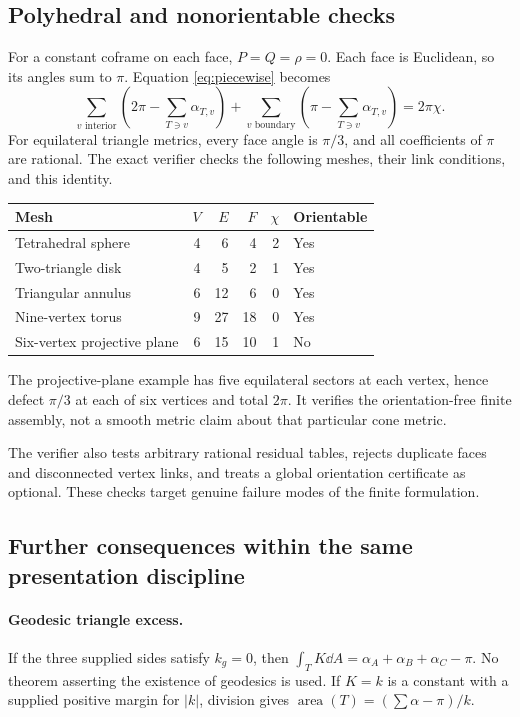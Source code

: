 \subsection{Polyhedral and nonorientable checks}

For a constant coframe on each face, $P=Q=\rho=0$. Each face is Euclidean, so its angles sum to $\pi$. Equation \eqref{eq:piecewise} becomes
\[
\sum_{v\text{ interior}}\left(2\pi-\sum_{T\ni v}\alpha_{T,v}\right)
+\sum_{v\text{ boundary}}\left(\pi-\sum_{T\ni v}\alpha_{T,v}\right)
=2\pi\chi.
\]
For equilateral triangle metrics, every face angle is $\pi/3$, and all coefficients of $\pi$ are rational. The exact verifier checks the following meshes, their link conditions, and this identity.
\begin{center}
\begin{tabular}{lrrrrl}
\toprule
Mesh & $V$ & $E$ & $F$ & $\chi$ & Orientable\\
\midrule
Tetrahedral sphere & 4&6&4&2&Yes\\
Two-triangle disk & 4&5&2&1&Yes\\
Triangular annulus & 6&12&6&0&Yes\\
Nine-vertex torus & 9&27&18&0&Yes\\
Six-vertex projective plane & 6&15&10&1&No\\
\bottomrule
\end{tabular}
\end{center}
The projective-plane example has five equilateral sectors at each vertex, hence defect $\pi/3$ at each of six vertices and total $2\pi$. It verifies the orientation-free finite assembly, not a smooth metric claim about that particular cone metric.

The verifier also tests arbitrary rational residual tables, rejects duplicate faces and disconnected vertex links, and treats a global orientation certificate as optional. These checks target genuine failure modes of the finite formulation.

\subsection{Further consequences within the same presentation discipline}

\paragraph{Geodesic triangle excess.}
If the three supplied sides satisfy $k_g=0$, then
$\int_TK\dd A=\alpha_A+\alpha_B+\alpha_C-\pi$.
No theorem asserting the existence of geodesics is used. If $K=k$ is a constant with a supplied positive margin for $|k|$, division gives
$\operatorname{area}(T)=(\sum\alpha-\pi)/k$.

